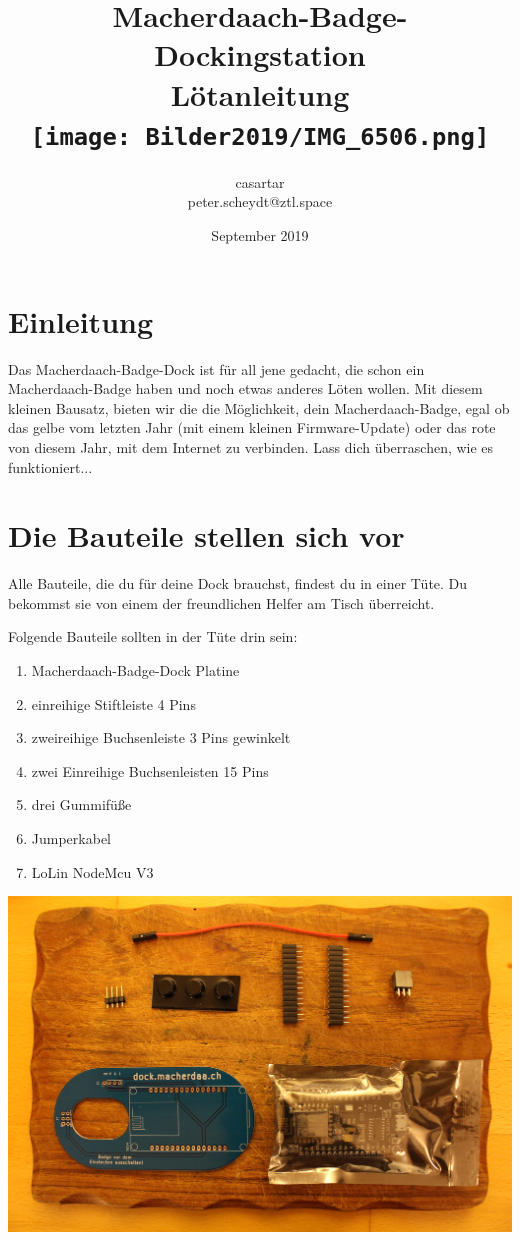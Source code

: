 \documentclass{article}
\title{Macherdaach-Badge-Dockingstation \\ Lötanleitung \\ [1cm]
\texttt{[image: Bilder2019/IMG\_6506.png]}
}
\date{September 2019}
\author{casartar\\peter.scheydt@ztl.space}
\begin{document}
\maketitle
\newpage
\section{Einleitung}

Das Macherdaach-Badge-Dock ist für all jene gedacht, die schon ein Macherdaach-Badge haben und noch etwas anderes Löten wollen. Mit diesem kleinen Bausatz, bieten wir die die Möglichkeit, dein Macherdaach-Badge, egal ob das gelbe vom letzten Jahr (mit einem kleinen Firmware-Update) oder das rote von diesem Jahr, mit dem Internet zu verbinden. Lass dich überraschen, wie es funktioniert...

\section{Die Bauteile stellen sich vor}
Alle Bauteile, die du für deine Dock brauchst, findest du in einer Tüte. Du bekommst sie von einem der freundlichen Helfer am Tisch überreicht.

Folgende Bauteile sollten in der Tüte drin sein:

\begin{enumerate}
	\item Macherdaach-Badge-Dock Platine
	\item einreihige Stiftleiste 4 Pins
	\item zweireihige Buchsenleiste 3 Pins gewinkelt
	\item zwei Einreihige Buchsenleisten 15 Pins
	\item drei Gummifüße
	\item Jumperkabel
	\item LoLin NodeMcu V3
\end{enumerate}



\begin{center}
\includegraphics[width=\textwidth]{Bilder2019/IMG_6462.JPG}
\label{fig:all_components}
\end{center}
\end{document}
